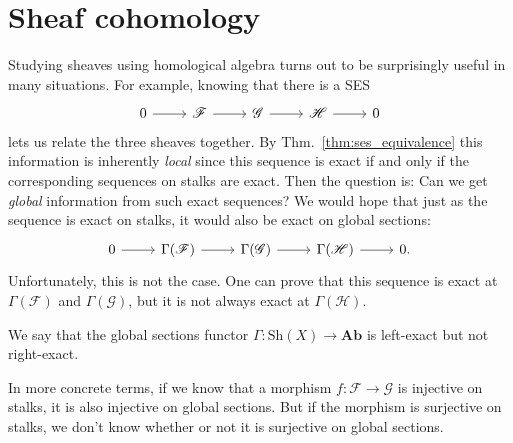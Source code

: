 \section{Sheaf cohomology}
Studying sheaves using homological algebra turns out to be surprisingly
useful in many situations. For example, knowing that there is a SES
\[
  \begin{tikzcd}
    0 \rar & \mathscr{F} \rar & \mathscr{G} \rar &
    \mathscr{H} \rar & 0
  \end{tikzcd}
\]
lets us relate the three sheaves together. By Thm.~\ref{thm:ses_equivalence}
this information is inherently \emph{local} since this sequence is exact
if and only if the corresponding sequences on stalks are exact.
Then the question is: Can we get \emph{global} information from
such exact sequences? We would hope that just as the sequence is exact
on stalks, it would also be exact on global sections:
\[
\begin{tikzcd}
  0 \rar & \Gamma(\mathscr{F}) \rar & \Gamma(\mathscr{G})
  \rar & \Gamma(\mathscr{H}) \rar & 0.
\end{tikzcd}
\]
Unfortunately, this is not the case. One can prove that this sequence
is exact at $\Gamma(\mathscr{F})$ and $\Gamma(\mathscr{G})$, but it
is not always exact at $\Gamma(\mathscr{H})$.
\begin{cat}
  We say that the global sections functor $\Gamma: \text{Sh}(X)\to \textbf{Ab}$ is left-exact but not right-exact.
\end{cat}
In more concrete terms, if we know that a morphism $f: \mathscr{F}
\to\mathscr{G}$ is injective on stalks, it is also injective on
global sections. But if the morphism is surjective on stalks, we don't
know whether or not it is surjective on global sections.

